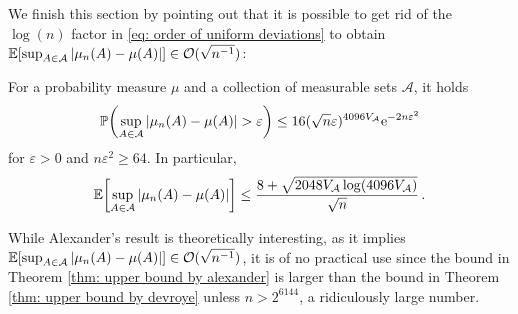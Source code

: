 We finish this section by pointing out that it is possible to get rid of the $\log(n)$ factor in \eqref{eq: order of uniform deviations} to obtain $\operatorname{\mathbb{E}}[\sup_{A \in \mathcal{A}} \abs{\mu_n(A) - \mu(A)}] \in \mathcal{O}(\sqrt{n^{-1}})$:

\begin{theorem}[Alexander, 1984]
\label{thm: upper bound by alexander}
For a probability measure $\mu$ and a collection of measurable sets $\mathcal{A}$, it holds
\[
    \P\left(\sup_{A \in \mathcal{A}} \abs{\mu_n(A) - \mu(A)} > \varepsilon\right) \leq 16 (\sqrt{n} \varepsilon)^{4096 V_{\mathcal{A}}} \e^{-2n\varepsilon^2}
\]
for $\varepsilon > 0$ and $n \varepsilon^2 \geq 64$. In particular,
\[
    \Exp\left[\sup_{A \in \mathcal{A}} \abs{\mu_n(A) - \mu(A)}\right] \leq \frac{8 + \sqrt{2048 V_{\mathcal{A}} \log(4096 V_{\mathcal{A}})}}{\sqrt{n}} \, .
\]
\end{theorem}

While Alexander's result is theoretically interesting, as it implies $\operatorname{\mathbb{E}}[\sup_{A \in \mathcal{A}} \abs{\mu_n(A) - \mu(A)}] \in \mathcal{O}(\sqrt{n^{-1}})$, it is of no practical use since the bound in Theorem \ref{thm: upper bound by alexander} is larger than the bound in Theorem \ref{thm: upper bound by devroye} unless $n > 2^{6144}$, a ridiculously large number.
